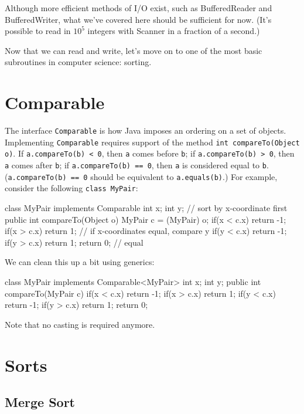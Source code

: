 Although more efficient methods of I/O exist, such as BufferedReader and BufferedWriter, what we've covered here should be sufficient for now. (It's possible to read in $10^5$ integers with Scanner in a fraction of a second.)

Now that we can read and write, let's move on to one of the most basic subroutines in computer science: sorting. 

\section{Comparable}

The interface \texttt{Comparable} is how Java imposes an ordering on a set of objects. Implementing \texttt{Comparable} requires support of the method \texttt{int compareTo(Object o)}. If \texttt{a.compareTo(b) < 0}, then \texttt{a} comes before \texttt{b}; if \texttt{a.compareTo(b) > 0}, then \texttt{a} comes after \texttt{b}; if \texttt{a.compareTo(b) == 0}, then \texttt{a} is considered equal to \texttt{b}. (\texttt{a.compareTo(b) == 0} should be equivalent to \texttt{a.equals(b)}.) For example, consider the following \texttt{class MyPair}:

\begin{mylstlisting}
class MyPair implements Comparable {
	int x;
	int y;
    // sort by x-coordinate first
	public int compareTo(Object o) {
		MyPair c = (MyPair) o;
		if(x < c.x) return -1;
		if(x > c.x) return 1;
		// if x-coordinates equal, compare y
		if(y < c.x) return -1;
		if(y > c.x) return 1;
		return 0; // equal
	}
}
\end{mylstlisting}

We can clean this up a bit using generics:

\begin{mylstlisting}
class MyPair implements Comparable<MyPair> {
	int x;
	int y;
	public int compareTo(MyPair c) {
		if(x < c.x) return -1;
		if(x > c.x) return 1;
		if(y < c.x) return -1;
		if(y > c.x) return 1;
		return 0;
	}
}
\end{mylstlisting}

Note that no casting is required anymore.

\section{Sorts}

\subsection{Merge Sort}

